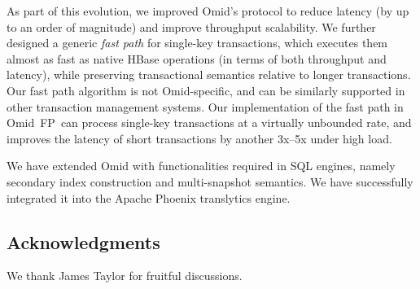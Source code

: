 \documentclass{vldb}
\newcommand{\sys}{Omid~FP}
\begin{document}
As part of this evolution, we
improved Omid's protocol to reduce latency (by up to an order of magnitude) and improve throughput scalability.
%
We further designed a generic \emph{fast path} for single-key transactions, 
which executes them  almost as fast as native HBase operations (in terms of 
both throughput and latency), while preserving
transactional semantics relative to longer transactions.
Our fast path algorithm is not Omid-specific, and can be similarly supported in 
other transaction management systems.
Our implementation of the fast path in \sys\ can process single-key
transactions  at a virtually unbounded rate, and improves the latency of short transactions
by another 3x--5x under high load.

We have extended Omid with functionalities required in SQL engines, namely 
secondary index construction and multi-snapshot semantics. 
We have successfully integrated it into the Apache Phoenix translytics engine. 

\subsection*{Acknowledgments}
We thank James Taylor for fruitful discussions. 




\end{document}
